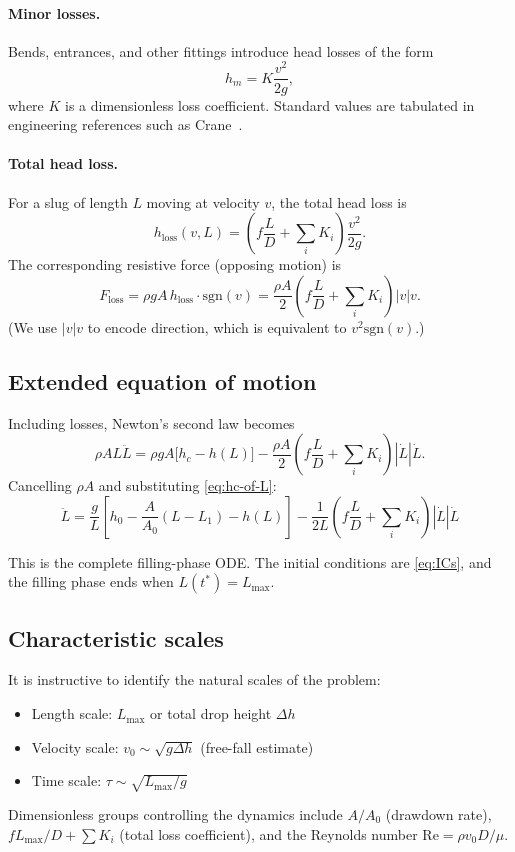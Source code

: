 \documentclass[11pt]{article}
\theoremstyle{definition}
\begin{document}
\paragraph{Minor losses.}
Bends, entrances, and other fittings introduce head losses of the form
\[
  h_m = K \frac{v^2}{2g},
\]
where $K$ is a dimensionless loss coefficient. Standard values are tabulated in engineering 
references such as Crane~\cite{crane}.

\paragraph{Total head loss.}
For a slug of length $L$ moving at velocity $v$, the total head loss is
\begin{equation}
  h_{\text{loss}}(v, L) = \left(f \frac{L}{D} + \sum_i K_i\right) \frac{v^2}{2g}.
  \label{eq:hloss}
\end{equation}
The corresponding resistive force (opposing motion) is
\[
  F_{\text{loss}} = \rho g A\, h_{\text{loss}} \cdot \text{sgn}(v) 
                  = \frac{\rho A}{2}\left(f \frac{L}{D} + \sum_i K_i\right) |v| v.
\]
(We use $|v|v$ to encode direction, which is equivalent to $v^2 \text{sgn}(v)$.)

\subsection{Extended equation of motion}

Including losses, Newton's second law becomes
\[
  \rho A L \ddot{L} = \rho g A\bigl[h_c - h(L)\bigr] 
                     - \frac{\rho A}{2}\left(f \frac{L}{D} + \sum_i K_i\right) |\dot{L}| \dot{L}.
\]
Cancelling $\rho A$ and substituting \eqref{eq:hc-of-L}:
\begin{equation}
  \boxed{\ddot{L} = \frac{g}{L}\left[h_0 - \frac{A}{A_0}(L - L_1) - h(L)\right]
         - \frac{1}{2L}\left(f \frac{L}{D} + \sum_i K_i\right) |\dot{L}| \dot{L}}
  \label{eq:filling-full}
\end{equation}

This is the complete filling-phase ODE. The initial conditions are \eqref{eq:ICs}, and 
the filling phase ends when $L(t^*) = L_{\max}$.

\subsection{Characteristic scales}

It is instructive to identify the natural scales of the problem:
\begin{itemize}[nosep]
  \item Length scale: $L_{\max}$ or total drop height $\Delta h$
  \item Velocity scale: $v_0 \sim \sqrt{g \Delta h}$ (free-fall estimate)
  \item Time scale: $\tau \sim \sqrt{L_{\max}/g}$
\end{itemize}
Dimensionless groups controlling the dynamics include $A/A_0$ (drawdown rate), 
$fL_{\max}/D + \sum K_i$ (total loss coefficient), and the Reynolds number 
$\text{Re} = \rho v_0 D/\mu$.
\end{document}
